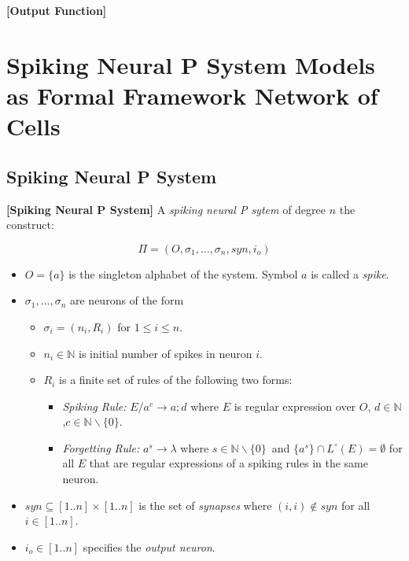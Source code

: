 \documentclass[a4paper]{article}
\theoremstyle{definition}
\newcommand{\ra}{\rightarrow}
\begin{document}
\label{def-output} \textbf{[Output Function]}


\section{Spiking Neural P System Models as Formal Framework Network of Cells} 


\subsection{Spiking Neural P System}

\label{def-snp} \textbf{[Spiking Neural P System]} A \emph{spiking neural P sytem} of
degree $n$ the construct:

$$\Pi = (O, \sigma_1,...,\sigma_n,syn,i_o)$$

\begin{itemize}
\item $O = \{a\}$ is the singleton alphabet of the system. Symbol $a$ is called a \emph{spike}.
\item $\sigma_1,...,\sigma_n$ are neurons of the form
      \begin{itemize}
      \item $\sigma_i = (n_i, R_i)$ for $1 \leq i \leq n$. 
      \item $n_i \in \mathbb{N}$ is initial number of spikes in neuron $i$. 
      \item $R_i$ is a finite set of rules of the following two forms:
            \begin{itemize}
            \item \emph{Spiking Rule:} $E/a^c \ra a;d$ where $E$ is regular expression over $O$, 
                  $d \in \mathbb{N}$,$c \in \mathbb{N}\backslash \{0\}$.
            \item \emph{Forgetting Rule:} $a^s \ra \lambda$ where $s \in \mathbb{N}\backslash\{0\}$\
                  and $\{a^s\} \cap L^{\circ}(E) = \emptyset$ for all $E$ that are regular 
                  expressions of a spiking rules in the same neuron.
            \end{itemize}
      \end{itemize}
\item $syn \subseteq [1..n] \times [1..n]$ is the set of \emph {synapses} where $(i,i) \notin syn$ 
      for all $i \in [1..n]$.
\item $i_o \in [1..n]$ specifies the \emph{output neuron}.
\end{itemize}
\end{document}
